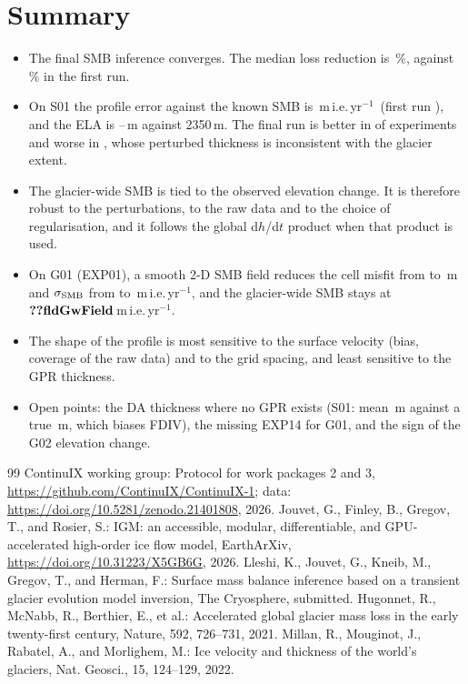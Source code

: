 \documentclass[10pt,a4paper]{article}
\newcommand{\mie}{m\,i.e.\,yr$^{-1}$}
\begin{document}
\section{Summary}
\begin{itemize}\setlength{\itemsep}{1pt}
\item The final SMB inference converges. The median loss reduction is \,\%, against \,\%
in the first run.
\item On S01 the profile error against the known SMB is \,\mie\ (first run ), and the ELA is
--\,m against 2350\,m. The final run is better in  of  experiments and
worse in , whose perturbed thickness is inconsistent with the glacier extent.
\item The glacier-wide SMB is tied to the observed elevation change. It is therefore robust to the perturbations, to the
raw data and to the choice of regularisation, and it follows the global d$h$/d$t$ product when that product is used.
\item On G01 (EXP01), a smooth 2-D SMB field reduces the cell misfit from  to \,m
and $\sigma_{\rm SMB}$ from  to \,\mie, and the glacier-wide SMB stays at $\V{fldGwField}$\,\mie.
\item The shape of the profile is most sensitive to the surface velocity (bias, coverage of the raw data) and to the
grid spacing, and least sensitive to the GPR thickness.
\item Open points: the DA thickness where no GPR exists (S01: mean \,m against a true \,m,
which biases FDIV), the missing EXP14 for G01, and the sign of the G02 elevation change.
\end{itemize}

\begin{thebibliography}{99}\small
{} ContinuIX working group: Protocol for work packages 2 and 3, \url{https://github.com/ContinuIX/ContinuIX-1}; data: \url{https://doi.org/10.5281/zenodo.21401808}, 2026.
 Jouvet, G., Finley, B., Gregov, T., and Rosier, S.: IGM: an accessible, modular, differentiable, and GPU-accelerated high-order ice flow model, EarthArXiv, \url{https://doi.org/10.31223/X5GB6G}, 2026.
 Lleshi, K., Jouvet, G., Kneib, M., Gregov, T., and Herman, F.: Surface mass balance inference based on a transient glacier evolution model inversion, The Cryosphere, submitted.
 Hugonnet, R., McNabb, R., Berthier, E., et al.: Accelerated global glacier mass loss in the early twenty-first century, Nature, 592, 726--731, 2021.
 Millan, R., Mouginot, J., Rabatel, A., and Morlighem, M.: Ice velocity and thickness of the world's glaciers, Nat. Geosci., 15, 124--129, 2022.
\end{thebibliography}
\end{document}

